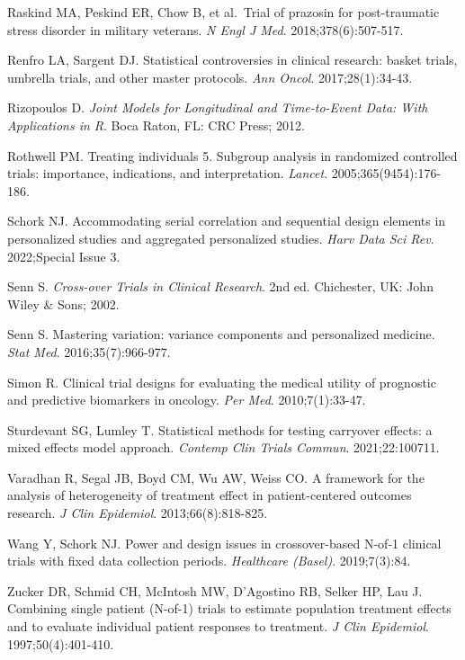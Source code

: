 \documentclass[
]{article}
\begin{document}
Raskind MA, Peskind ER, Chow B, et al.~Trial of prazosin for
post-traumatic stress disorder in military veterans.
\textit{N Engl J Med}. 2018;378(6):507-517.

Renfro LA, Sargent DJ. Statistical controversies in clinical
research: basket trials, umbrella trials, and other master
protocols. \textit{Ann Oncol}. 2017;28(1):34-43.

Rizopoulos D. \textit{Joint Models for Longitudinal and
Time-to-Event Data: With Applications in R}. Boca Raton, FL:
CRC Press; 2012.

Rothwell PM. Treating individuals 5. Subgroup analysis in
randomized controlled trials: importance, indications, and
interpretation. \textit{Lancet}. 2005;365(9454):176-186.

Schork NJ. Accommodating serial correlation and sequential
design elements in personalized studies and aggregated
personalized studies. \textit{Harv Data Sci Rev}. 2022;Special
Issue 3.

Senn S. \textit{Cross-over Trials in Clinical Research}. 2nd ed.
Chichester, UK: John Wiley \& Sons; 2002.

Senn S. Mastering variation: variance components and
personalized medicine. \textit{Stat Med}. 2016;35(7):966-977.

Simon R. Clinical trial designs for evaluating the medical
utility of prognostic and predictive biomarkers in oncology.
\textit{Per Med}. 2010;7(1):33-47.

Sturdevant SG, Lumley T. Statistical methods for testing
carryover effects: a mixed effects model approach.
\textit{Contemp Clin Trials Commun}. 2021;22:100711.

Varadhan R, Segal JB, Boyd CM, Wu AW, Weiss CO. A framework for
the analysis of heterogeneity of treatment effect in
patient-centered outcomes research. \textit{J Clin Epidemiol}.
2013;66(8):818-825.

Wang Y, Schork NJ. Power and design issues in crossover-based
N-of-1 clinical trials with fixed data collection periods.
\textit{Healthcare (Basel)}. 2019;7(3):84.

Zucker DR, Schmid CH, McIntosh MW, D'Agostino RB, Selker HP,
Lau J. Combining single patient (N-of-1) trials to estimate
population treatment effects and to evaluate individual patient
responses to treatment. \textit{J Clin Epidemiol}. 1997;50(4):401-410.
\end{document}
